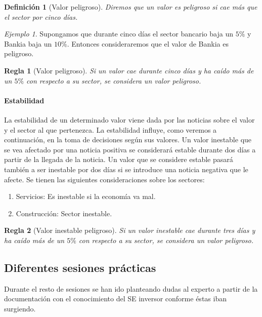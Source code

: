 \documentclass[11pt,leqno]{article}
\theoremstyle{definition_wo_parentheses}
\newtheorem{definicion}{Definición}[subsection]
\theoremstyle{plain}
\newtheorem{regla}{Regla}[subsection]
\theoremstyle{remark}
\newtheorem{ejemplo}{Ejemplo}[subsection]
\begin{document}
\begin{definicion}[Valor peligroso]
	Diremos que un valor es peligroso si cae más que el sector por cinco días.
\end{definicion}

\begin{ejemplo}
	Supongamos que durante cinco días el sector bancario baja un $5\%$ y Bankia baja un $10\%$. Entonces consideraremos que el valor de Bankia es peligroso.
\end{ejemplo}

\begin{regla}[Valor peligroso]
	Si un valor cae durante cinco días y ha caído más de un $5\%$ con respecto a su sector, se considera un valor peligroso.
\end{regla}

\paragraph{Estabilidad} La estabilidad de un determinado valor viene dada por las noticias sobre el valor y el sector al que pertenezca. La estabilidad influye, como veremos a continuación, en la toma de decisiones según sus valores. Un valor inestable que se vea afectado por una noticia positiva se considerará estable durante dos días a partir de la llegada de la noticia. Un valor que se considere estable pasará también a ser inestable por dos días si se introduce una noticia negativa que le afecte. Se tienen las siguientes consideraciones sobre los sectores:

\begin{enumerate}[a]
\item Servicios: Es inestable si la economía va mal.
\item Construcción: Sector inestable.
\end{enumerate}

\begin{regla}[Valor inestable peligroso]
	Si un valor inestable cae durante tres días y ha caído más de un $5\%$ con respecto a su sector, se considera un valor peligroso.
\end{regla}

\subsection{Diferentes sesiones prácticas}

	Durante el resto de sesiones se han ido planteando dudas al experto a partir de la documentación con el conocimiento del SE inversor conforme éstas iban surgiendo.
	
\end{document}
